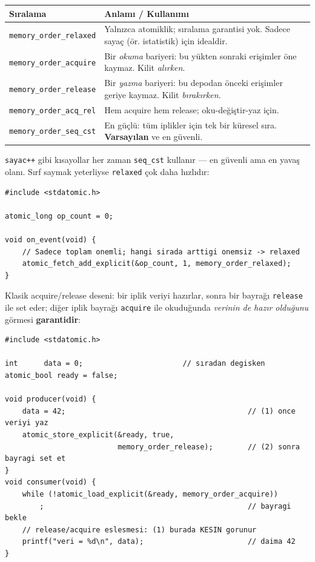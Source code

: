 \documentclass[11pt,a4paper]{article}
\newcommand{\code}[1]{\texttt{\color{koyuGri}#1}}
\begin{document}
\begin{center}
\begin{tabularx}{\textwidth}{@{}>{\raggedright\arraybackslash}p{} >{\raggedright\arraybackslash}X@{}}
\toprule
\rowcolor{acikMavi}\color{anaMavi}\textbf{Sıralama} & \color{anaMavi}\textbf{Anlamı / Kullanımı}\\
\midrule
\code{memory\_order\_relaxed} & Yalnızca atomiklik; sıralama garantisi yok. Sadece sayaç (ör. istatistik) için idealdir.\\
\rowcolor{acikGri}\code{memory\_order\_acquire} & Bir \emph{okuma} bariyeri: bu yükten sonraki erişimler öne kaymaz. Kilit \emph{alırken}.\\
\code{memory\_order\_release} & Bir \emph{yazma} bariyeri: bu depodan önceki erişimler geriye kaymaz. Kilit \emph{bırakırken}.\\
\rowcolor{acikGri}\code{memory\_order\_acq\_rel} & Hem acquire hem release; oku-değiştir-yaz için.\\
\code{memory\_order\_seq\_cst} & En güçlü: tüm iplikler için tek bir küresel sıra. \textbf{Varsayılan} ve en güvenli.\\
\bottomrule
\end{tabularx}
\end{center}

\code{sayac++} gibi kısayollar her zaman \code{seq\_cst} kullanır --- en
güvenli ama en yavaş olanı. Sırf saymak yeterliyse \code{relaxed} çok daha
hızlıdır:

\begin{lstlisting}
#include <stdatomic.h>

atomic_long op_count = 0;

void on_event(void) {
    // Sadece toplam onemli; hangi sirada arttigi onemsiz -> relaxed
    atomic_fetch_add_explicit(&op_count, 1, memory_order_relaxed);
}
\end{lstlisting}

Klasik acquire/release deseni: bir iplik veriyi hazırlar, sonra bir bayrağı
\code{release} ile set eder; diğer iplik bayrağı \code{acquire} ile
okuduğunda \emph{verinin de hazır olduğunu} görmesi \textbf{garantidir}:

\begin{lstlisting}
#include <stdatomic.h>

int      data = 0;                       // sıradan degisken
atomic_bool ready = false;

void producer(void) {
    data = 42;                                          // (1) once veriyi yaz
    atomic_store_explicit(&ready, true,
                          memory_order_release);        // (2) sonra bayragi set et
}
void consumer(void) {
    while (!atomic_load_explicit(&ready, memory_order_acquire))
        ;                                               // bayragi bekle
    // release/acquire eslesmesi: (1) burada KESIN gorunur
    printf("veri = %d\n", data);                        // daima 42
}
\end{lstlisting}
\end{document}
